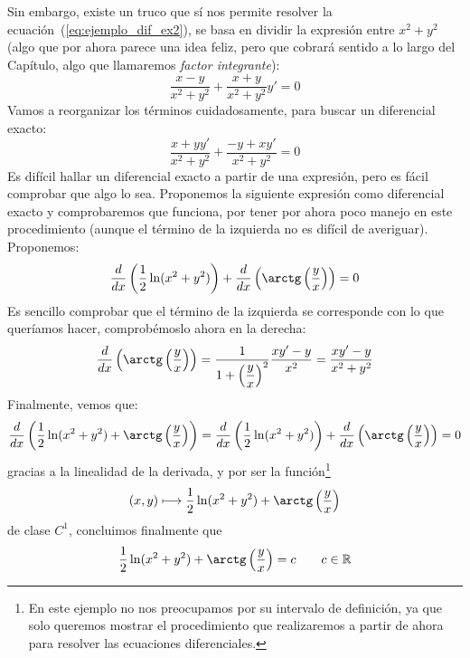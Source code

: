 \begin{ejemplo}
    Sin embargo, existe un truco que sí nos permite resolver la ecuación~(\ref{eq:ejemplo_dif_ex2}), se basa en dividir la expresión entre $x^2+y^2$ (algo que por ahora parece una idea feliz, pero que cobrará sentido a lo largo del Capítulo, algo que llamaremos \textit{factor integrante}):
    \begin{equation*}
        \dfrac{x-y}{x^2+y^2} + \dfrac{x+y}{x^2+y^2}y' = 0
    \end{equation*}
    Vamos a reorganizar los términos cuidadosamente, para buscar un diferencial exacto:
    \begin{equation*}
        \dfrac{x+yy'}{x^2+y^2} + \dfrac{-y+xy'}{x^2+y^2} = 0
    \end{equation*}
    Es difícil hallar un diferencial exacto a partir de una expresión, pero es fácil comprobar que algo lo sea. Proponemos la siguiente expresión como diferencial exacto y comprobaremos que funciona, por tener por ahora poco manejo en este procedimiento (aunque el término de la izquierda no es difícil de averiguar). Proponemos:
    \begin{equation*}
        \dfrac{d}{dx}\left(\dfrac{1}{2}\ln(x^2+y^2)\right) + \dfrac{d}{dx}\left(\arctg\left(\dfrac{y}{x}\right)\right) = 0
    \end{equation*}
    Es sencillo comprobar que el término de la izquierda se corresponde con lo que queríamos hacer, comprobémoslo ahora en la derecha:
    \begin{equation*}
        \dfrac{d}{dx}\left(\arctg\left(\dfrac{y}{x}\right)\right) = \dfrac{1}{1+{\left(\dfrac{y}{x}\right)}^{2}} \dfrac{xy'-y}{x^2} = \dfrac{xy'-y}{x^2+y^2}
    \end{equation*}
    Finalmente, vemos que:
    \begin{equation*}
        \dfrac{d}{dx}\left(\dfrac{1}{2}\ln(x^2+y^2)+\arctg\left(\dfrac{y}{x}\right)\right) = \dfrac{d}{dx}\left(\dfrac{1}{2}\ln(x^2+y^2)\right) + \dfrac{d}{dx}\left(\arctg\left(\dfrac{y}{x}\right)\right) = 0
    \end{equation*}
    gracias a la linealidad de la derivada, y por ser la función\footnote{En este ejemplo no nos preocupamos por su intervalo de definición, ya que solo queremos mostrar el procedimiento que realizaremos a partir de ahora para resolver las ecuaciones diferenciales.}
    \begin{equation*}
        (x,y) \longmapsto \dfrac{1}{2}\ln(x^2+y^2) + \arctg\left(\dfrac{y}{x}\right)
    \end{equation*}
    de clase $C^1$, concluimos finalmente que
    \begin{equation*}
        \dfrac{1}{2}\ln(x^2+y^2) + \arctg\left(\dfrac{y}{x}\right) = c \qquad c\in \mathbb{R}
    \end{equation*}
\end{ejemplo}
